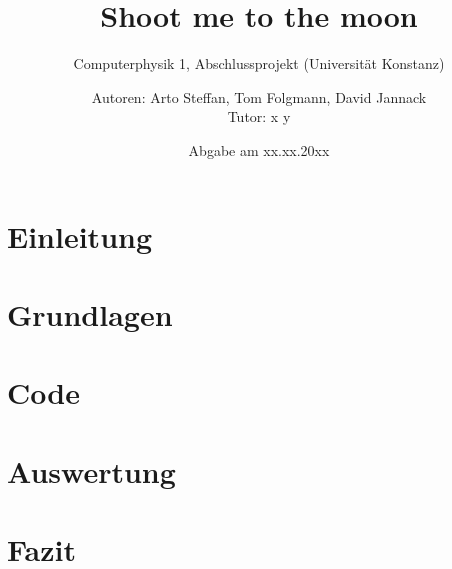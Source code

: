 \documentclass[
    oneside, 
    footinclude=off, 
    captions=tableheading, 
    DIV=12;usenames,
    dvipsnames
]{scrartcl}
\begin{document}
    \title{Shoot me to the moon}
    \subtitle{Computerphysik 1, Abschlussprojekt (Universität Konstanz)}
    \author{Autoren: Arto Steffan, Tom Folgmann, David Jannack \\ \large{Tutor: x y}}
    \date{Abgabe am xx.xx.20xx}
    \maketitle
    \thispagestyle{empty}
    \section*{Einleitung}
        

    \newpage


    \tableofcontents
    \thispagestyle{empty}	
    \newpage
    \setcounter{page}{1}


\newpage
\section{Grundlagen}
    
	

\newpage
\section{Code}
    

\newpage
\section{Auswertung}
    

\newpage
\section{Fazit}
    


\newpage
    
\newpage
    \listoffigures
    \listoftables


%
\end{document}
